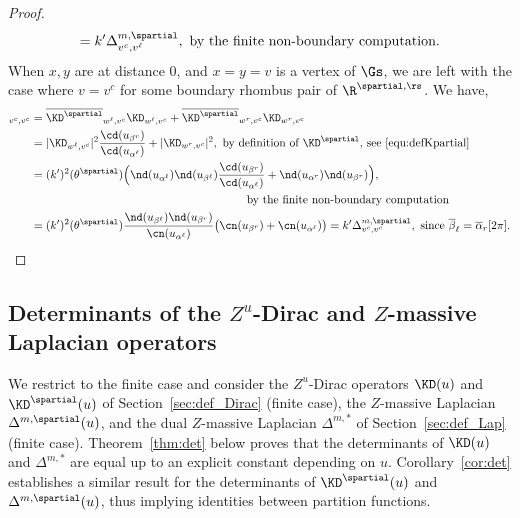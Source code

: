 \documentclass[a4paper,twoside,11pt]{article}
\begin{document}
\begin{proof}
\begin{align*}
=k'\Delta^{m,\spartial}_{v^c,v^\ell},\text{ by the finite non-boundary computation}.
\end{align*}
When $x,y$ are at distance 0, and $x=y=v$ is a vertex of $\Gs$, we are left with the case where $v=v^c$ for some boundary rhombus pair of 
$\R^{\spartial,\rs}$. We have,
\begin{align*}
[{\overline{\KD^\spartial}}^{\,t\,}\KD]_{v^c,v^c}&=
\overline{\KD^\spartial}_{w^\ell,v^c}\KD_{w^\ell,v^c}+\overline{\KD^\spartial}_{w^r,v^c}\KD_{w^r,v^c}\\
&=|\KD_{w^\ell,v^c}|^2\frac{\cd(u_{\beta^r})}{\cd(u_{\alpha^\ell})}+ |\KD_{w^r,v^c}|^2,
\text{ by definition of $\KD^\spartial$, see~\eqref{equ:defKpartial}}\\
&=(k')^2\sc(\theta^\spartial)\Bigl(\nd(u_{\alpha^\ell})\nd(u_{\beta^\ell})\frac{\cd(u_{\beta^r})}{\cd(u_{\alpha^\ell})}
+\nd(u_{\alpha^r})\nd(u_{\beta^r})\Bigr),\\
&\hspace{6.5cm}\text{ by the finite non-boundary computation}\\
&=(k')^2\sc(\theta^\spartial)\frac{\nd(u_{\beta^\ell})\nd(u_{\beta^r})}{\cn(u_{\alpha^\ell})}
\bigl(\cn(u_{\beta^r})+\cn(u_{\alpha^\ell})\bigr)=k' \Delta^{m,\spartial}_{v^c,v^c},
\text{ since $\overline{\beta}_\ell=\overline{\alpha}_r[2\pi]$}.\qedhere
\end{align*}
\end{proof}




\subsection{Determinants of the $Z^u$-Dirac and $Z$-massive Laplacian operators}\label{sec:det_Kpartial_Lap}

We restrict to the finite case and consider the $Z^u$-Dirac operators $\KD(u)$ and $\KD^\spartial(u)$
of Section~\ref{sec:def_Dirac} (finite case), the $Z$-massive Laplacian $\Delta^{m,\spartial}(u)$, and the dual $Z$-massive Laplacian
$\Delta^{m,*}$ of Section~\ref{sec:def_Lap} (finite case). 
Theorem~\ref{thm:det} below proves that the 
determinants of $\KD(u)$ and $\Delta^{m,*}$ are equal up to an explicit constant depending on $u$. Corollary~\ref{cor:det} establishes a 
similar result for the determinants of $\KD^{\spartial}(u)$ and $\Delta^{m,\spartial}(u)$, thus implying identities between 
partition functions.
\end{document}
